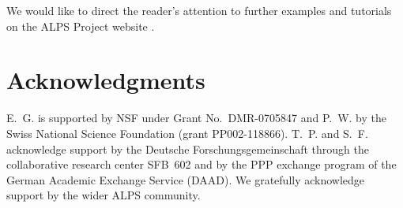 \documentclass[3p,twocolumn]{elsarticle}
\begin{document}
We would like to direct the reader's attention to further examples and tutorials on the ALPS Project website \cite{ALPS}.

\section{Acknowledgments}
E.~G. is supported by NSF under Grant No.~DMR-0705847 and P.~W. by the Swiss National Science Foundation (grant PP002-118866). T.~P. and S.~F. acknowledge support by the Deutsche Forschungsgemeinschaft through the collaborative research center SFB~602 and by the PPP exchange program of the German Academic Exchange Service (DAAD).
We gratefully acknowledge support by the wider ALPS community.



\end{document}
